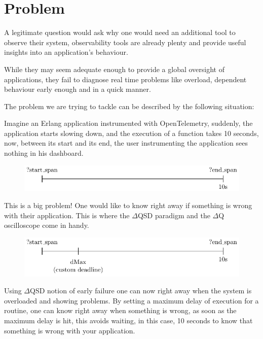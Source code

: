 \section{Problem}
    A legitimate question would ask why one would need an additional tool to observe their system, observability tools are already plenty and provide useful insights into an application's behaviour.
    
    While they may seem adequate enough to provide a global oversight of applications, they fail to diagnose real time problems like overload, dependent behaviour early enough and in a quick manner. 
    
    The problem we are trying to tackle can be described by the following situation: 

    Imagine an Erlang application instrumented with OpenTelemetry, suddenly, the application starts slowing down, and the execution of a function takes 10 seconds, now, between its start and its end, the user instrumenting the application sees nothing in his dashboard.
    \begin{figure}[H]
        \begin{center}
            \includegraphics{tikz/start_end.pdf}
        \end{center}
    \end{figure}
    This is a big problem! One would like to know right away if something is wrong with their application. This is where the $\Delta$QSD paradigm and the $\Delta$Q oscilloscope come in handy.
    \begin{figure}[H]
        \begin{center}
            \includegraphics{tikz/start_end_dmax.pdf}
        \end{center}
    \end{figure}
    Using $\Delta$QSD notion of early failure one can now right away when the system is overloaded and showing problems. By setting a maximum delay of execution for a routine, one can know right away when something is wrong, as soon as the maximum delay is hit, this avoids waiting, in this case, 10 seconds to know that something is wrong with your application.
